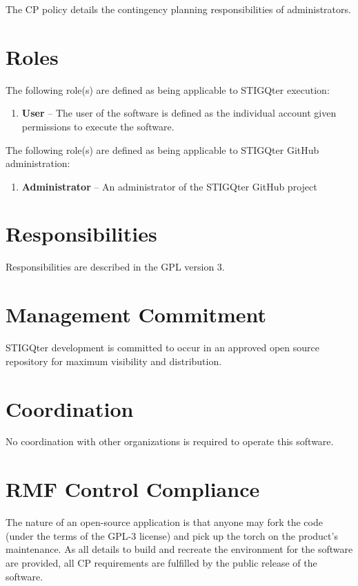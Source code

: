 \documentclass[letterpaper, 10pt, twoside]{article}
\begin{document}
The CP policy details the contingency planning responsibilities of administrators.

\section{Roles}
\label{sec:roles}

The following role(s) are defined as being applicable to STIGQter execution:
\begin{enumerate}
	\item \textbf{User} -- The user of the software is defined as the individual account given permissions to execute the software.
\end{enumerate}

The following role(s) are defined as being applicable to STIGQter GitHub administration:
\begin{enumerate}
	\item \textbf{Administrator} -- An administrator of the STIGQter GitHub project
\end{enumerate}

\section{Responsibilities}
\label{sec:responsibilities}

Responsibilities are described in the GPL version 3.

\section{Management Commitment}

STIGQter development is committed to occur in an approved open source repository for maximum visibility and distribution.

\section{Coordination}

No coordination with other organizations is required to operate this software.

\section{RMF Control Compliance}

The nature of an open-source application is that anyone may fork the code (under the terms of the GPL-3 license) and pick up the torch on the product's maintenance. As all details to build and recreate the environment for the software are provided, all CP requirements are fulfilled by the public release of the software.
\end{document}
